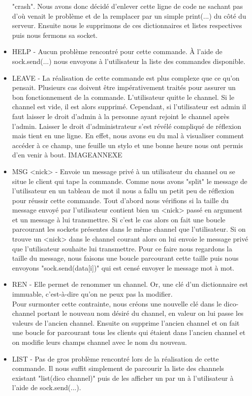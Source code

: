 \documentclass[12pt]{article}
\begin{document}
\begin{itemize}
    "crash". Nous avons donc décidé d'enlever cette ligne de code ne sachant pas d'où venait le problème et de la remplacer par un simple print(...) du côté du serveur. Ensuite nous le supprimons de ces dictionnaires et listes respectives puis nous fermons sa socket.\\
    \item HELP - Aucun problème rencontré pour cette commande. À l'aide de sock.send(...) nous envoyons à l'utilisateur la liste des commandes disponible. \\
    \item LEAVE - La réalisation de cette commande est plus complexe que ce qu'on pensait. Plusieurs cas doivent être impérativement traités pour assurer un bon fonctionnement de la commande. L'utilisateur quitte le channel. Si le channel est vide, il est alors supprimé. 
    Cependant, si l'utilisateur est admin il faut laisser le droit d'admin à la personne ayant rejoint le channel après l'admin.
    Laisser le droit d'administrateur s'est révélé compliqué de réflexion mais tient en une ligne. En effet, nous avons eu du mal à visualiser comment accéder à ce champ, une feuille un stylo et une bonne heure nous ont permis d'en venir à bout. IMAGEANNEXE \\
    \item MSG <nick>  - Envoie un message privé à un utilisateur du channel ou se situe le client qui tape la commande. Comme nous avons "split" le message de l'utilisateur en un tableau de mot il nous a fallu un petit peu de réflexion pour réussir cette commande.
    Tout d'abord nous vérifions si la taille du message envoyé par l'utilisateur contient bien un <nick> passé en argument et un message à lui transmettre. Si c'est le cas alors on fait une boucle parcourant les sockets présentes dans le même channel que 
    l'utilisateur. Si on trouve un <nick> dans le channel courant alors on lui envoie le message privé que l'utilisateur souhaite lui transmettre. Pour ce faire nous regardons la taille du message, nous faisons une boucle parcourant cette taille puis nous 
    envoyons "sock.send(data[i])" qui est censé envoyer le message mot à mot.\\
    \item REN - Elle permet de renommer un channel. Or, une clé d'un dictionnaire est immuable, c'est-à-dire qu'on ne peux pas la modifier.\\ Pour surmonter cette contrainte,
    nous créons une nouvelle clé dans le dico-channel portant le nouveau nom désiré du channel, en valeur on lui passe les valeurs de l'ancien channel. Ensuite on supprime l'ancien channel et on fait une boucle for parcourant
    tous les clients qui étaient dans l'ancien channel et on modifie leurs champs channel avec le nom du nouveau.\\
    \item LIST - Pas de gros problème rencontré lors de la réalisation de cette commande. Il nous suffit simplement de parcourir la liste des channels existant "list(dico channel)" puis de les afficher un par un à l'utilisateur
    à l'aide de sock.send(...).\\
\end{itemize}
\end{document}
